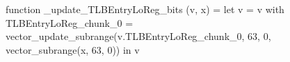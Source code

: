 function _update_TLBEntryLoReg_bits (v, x) = let v = { v with TLBEntryLoReg_chunk_0 = vector_update_subrange(v.TLBEntryLoReg_chunk_0, 63, 0, vector_subrange(x, 63, 0)) } in v
